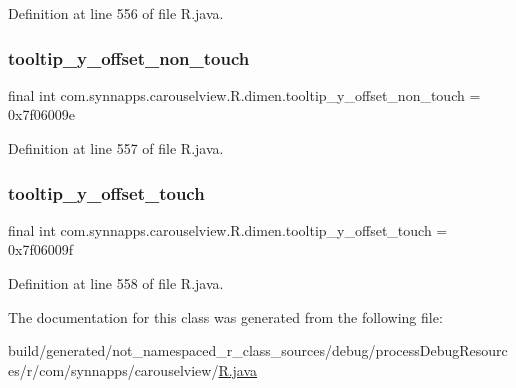 Definition at line 556 of file R.\+java.

\mbox{\label{classcom_1_1synnapps_1_1carouselview_1_1_r_1_1dimen_a58ff33fa5fc7a378ea08587f7ddc8915}} 
\subsubsection{\texorpdfstring{tooltip\_y\_offset\_non\_touch}{tooltip\_y\_offset\_non\_touch}}
{\footnotesize\ttfamily final int com.\+synnapps.\+carouselview.\+R.\+dimen.\+tooltip\+\_\+y\+\_\+offset\+\_\+non\+\_\+touch = 0x7f06009e\hspace{0.3cm}{\ttfamily [static]}}



Definition at line 557 of file R.\+java.

\mbox{\label{classcom_1_1synnapps_1_1carouselview_1_1_r_1_1dimen_a306c12dc324e70dad041a6355795fa4d}} 
\subsubsection{\texorpdfstring{tooltip\_y\_offset\_touch}{tooltip\_y\_offset\_touch}}
{\footnotesize\ttfamily final int com.\+synnapps.\+carouselview.\+R.\+dimen.\+tooltip\+\_\+y\+\_\+offset\+\_\+touch = 0x7f06009f\hspace{0.3cm}{\ttfamily [static]}}



Definition at line 558 of file R.\+java.



The documentation for this class was generated from the following file\+:\begin{DoxyCompactItemize}
\item 
build/generated/not\+\_\+namespaced\+\_\+r\+\_\+class\+\_\+sources/debug/process\+Debug\+Resources/r/com/synnapps/carouselview/\mbox{\hyperlink{com_2synnapps_2carouselview_2_r_8java}{R.\+java}}\end{DoxyCompactItemize}

